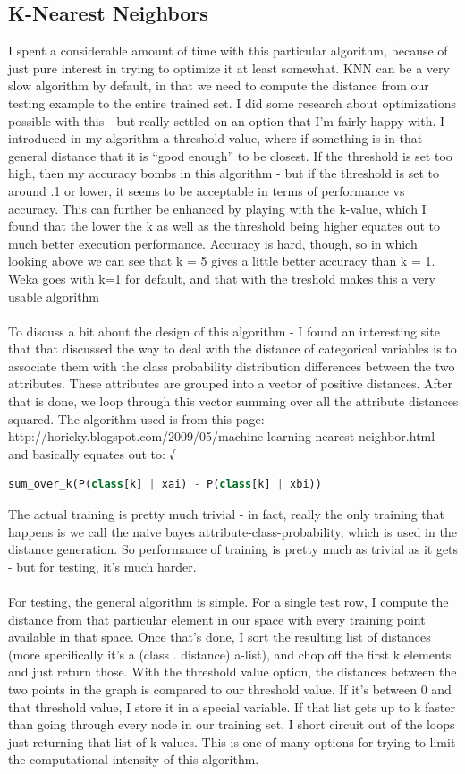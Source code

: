 \documentclass{article}
\begin{document}
\subsection{K-Nearest Neighbors}
I spent a considerable amount of time with this particular algorithm, because of just pure interest in trying to optimize it at least somewhat.  KNN can be a very slow algorithm by default, in that we need to compute the distance from our testing example to the entire trained set.  I did some research about optimizations possible with this - but really settled on an option that I'm fairly happy with.  I introduced in my algorithm a threshold value, where if something is in that general distance that it is ``good enough'' to be closest.  If the threshold is set too high, then my accuracy bombs in this algorithm - but if the threshold is set to around .1 or lower, it seems to be acceptable in terms of performance vs accuracy.  This can further be enhanced by playing with the k-value, which I found that the lower the k as well as the threshold being higher equates out to much better execution performance.  Accuracy is hard, though, so in which looking above we can see that k = 5 gives a little better accuracy than k = 1.  Weka goes with k=1 for default, and that with the treshold makes this a very usable algorithm\\
\\
To discuss a bit about the design of this algorithm - I found an interesting site that that discussed the way to deal with the distance of categorical variables is to associate them with the class probability distribution differences between the two attributes.  These attributes are grouped into a vector of positive distances.  After that is done, we loop through this vector summing over all the attribute distances squared.  The algorithm used is from this page: http://horicky.blogspot.com/2009/05/machine-learning-nearest-neighbor.html and basically equates out to:
√\begin{lstlisting}[frame=single,language=python]
sum_over_k(P(class[k] | xai) - P(class[k] | xbi))
\end{lstlisting}
The actual training is pretty much trivial - in fact, really the only training that happens is we call the naive bayes attribute-class-probability, which is used in the distance generation.  So performance of training is pretty much as trivial as it gets - but for testing, it's much harder.\\
\\
For testing, the general algorithm is simple. For a single test row, I compute the distance from that particular element in our space with every training point available in that space.  Once that's done, I sort the resulting list of distances (more specifically it's a (class . distance) a-list), and chop off the first k elements and just return those.  With the threshold value option, the distances between the two points in the graph is compared to our threshold value.  If it's between 0 and that threshold value, I store it in a special variable.  If that list gets up to k faster than going through every node in our training set, I short circuit out of the loops just returning that list of k values.  This is one of many options for trying to limit the computational intensity of this algorithm.  
\end{document}
